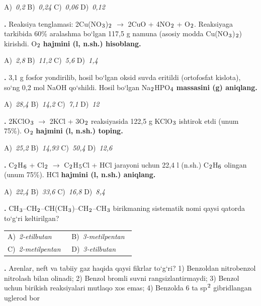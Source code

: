 \documentclass[11pt,a4paper]{article}
\renewcommand{\textsubscript}[1]{\ensuremath{_{\text{\fontsize{8}{8}\selectfont #1}}}}
\renewcommand{\textsuperscript}[1]{\ensuremath{^{\text{\fontsize{8}{8}\selectfont #1}}}}
\newcommand{\qn}[1]{\textbf{\fontsize{11.5}{13}\selectfont #1}}
\newcommand{\qsep}{\par\vspace{1pt}\noindent\rule{0pt}{0.4pt}\par\vspace{5pt}}
\begin{document}
\begin{multicols}{2}
\noindent A)~\textsl{0,2} \hfill B)~\textsl{0,24} \hfill C)~\textsl{0,06} \hfill D)~\textsl{0,12}\par
\qsep
\noindent\qn{17.} Reaksiya tenglamasi: 2Cu(NO\textsubscript{3})\textsubscript{2} $\to$ 2CuO + 4NO\textsubscript{2} + O\textsubscript{2}. Reaksiyaga tarkibida 60\% aralashma bo`lgan 117,5 g namuna (asosiy modda Cu(NO\textsubscript{3})\textsubscript{2}) kirishdi. O\textsubscript{2} \textbf{hajmini (l, n.sh.) hisoblang.}

\noindent A)~\textsl{2,8} \hfill B)~\textsl{11,2} \hfill C)~\textsl{5,6} \hfill D)~\textsl{1,4}\par
\qsep
\noindent\qn{18.} 3,1 g fosfor yondirilib, hosil bo`lgan oksid suvda eritildi (ortofosfat kislota), so`ng 0,2 mol NaOH qo`shildi. Hosil bo`lgan Na\textsubscript{2}HPO\textsubscript{4} \textbf{massasini (g) aniqlang.}

\noindent A)~\textsl{28,4} \hfill B)~\textsl{14,2} \hfill C)~\textsl{7,1} \hfill D)~\textsl{12}\par
\qsep
\noindent\qn{19.} 2KClO\textsubscript{3} $\to$ 2KCl + 3O\textsubscript{2} reaksiyasida 122,5 g KClO\textsubscript{3} ishtirok etdi (unum 75\%). O\textsubscript{2} \textbf{hajmini (l, n.sh.) toping.}

\noindent A)~\textsl{25,2} \hfill B)~\textsl{14,93} \hfill C)~\textsl{50,4} \hfill D)~\textsl{12,6}\par
\qsep
\noindent\qn{20.} C\textsubscript{2}H\textsubscript{6} + Cl\textsubscript{2} $\to$ C\textsubscript{2}H\textsubscript{5}Cl + HCl jarayoni uchun 22,4 l (n.sh.) C\textsubscript{2}H\textsubscript{6} olingan (unum 75\%). HCl \textbf{hajmini (l, n.sh.) aniqlang.}

\noindent A)~\textsl{22,4} \hfill B)~\textsl{33,6} \hfill C)~\textsl{16,8} \hfill D)~\textsl{8,4}\par
\qsep
\noindent\qn{21.} CH\textsubscript{3}--CH\textsubscript{2}--CH(CH\textsubscript{3})--CH\textsubscript{2}--CH\textsubscript{3} birikmaning sistematik nomi qaysi qatorda to`g`ri keltirilgan?

\noindent\begin{tabular}{@{}p{0.47\linewidth}@{}p{0.47\linewidth}@{}}
A)~\textsl{2-etilbutan} & B)~\textsl{3-metilpentan} \\
C)~\textsl{2-metilpentan} & D)~\textsl{3-etilbutan} \\
\end{tabular}\par
\qsep
\noindent\qn{22.} Arenlar, neft va tabiiy gaz haqida qaysi fikrlar to`g`ri? 1) Benzoldan nitrobenzol nitrolash bilan olinadi; 2) Benzol bromli suvni rangsizlantirmaydi; 3) Benzol uchun birikish reaksiyalari mutlaqo xos emas; 4) Benzolda 6 ta sp\textsuperscript{2} gibridlangan uglerod bor


\end{multicols}
\end{document}
